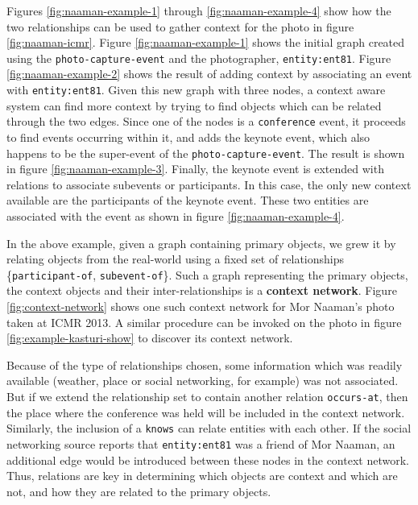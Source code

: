 Figures \ref{fig:naaman-example-1} through \ref{fig:naaman-example-4} show how the two relationships can be used to gather context for the photo in figure \ref{fig:naaman-icmr}. Figure \ref{fig:naaman-example-1} shows the initial graph created using the \texttt{photo-capture-event} and the photographer, \texttt{entity:ent81}. Figure \ref{fig:naaman-example-2} shows the result of adding context by associating an event with \texttt{entity:ent81}. Given this new graph with three nodes, a context aware system can find more context by trying to find objects which can be related through the two edges. Since one of the nodes is a \texttt{conference} event, it proceeds to find events occurring within it, and adds the keynote event, which also happens to be the super-event of the \texttt{photo-capture-event}. The result is shown in figure \ref{fig:naaman-example-3}. Finally, the keynote event is extended with relations to associate subevents or participants. In this case, the only new context available are the participants of the keynote event. These two entities are associated with the event as shown in figure \ref{fig:naaman-example-4}. 

In the above example, given a graph containing primary objects, we grew it by relating objects from the real-world using a fixed set of relationships \{\texttt{participant-of}, \texttt{subevent-of}\}. Such a graph representing the primary objects, the context objects and their inter-relationships is a \textbf{context network}. Figure \ref{fig:context-network} shows one such context network for Mor Naaman's photo taken at ICMR 2013. A similar procedure can be invoked on the photo in figure \ref{fig:example-kasturi-show} to discover its context network.

Because of the type of relationships chosen, some information which was readily available (weather, place or social networking, for example) was not associated. But if we extend the relationship set to contain another relation \texttt{occurs-at}, then the place where the conference was held will be included in the context network. Similarly, the inclusion of a \texttt{knows} can relate entities with each other. If the social networking source reports that \texttt{entity:ent81} was a friend of Mor Naaman, an additional edge would be introduced between these nodes in the context network. Thus, relations are key in determining which objects are context and which are not, and how they are related to the primary objects.

